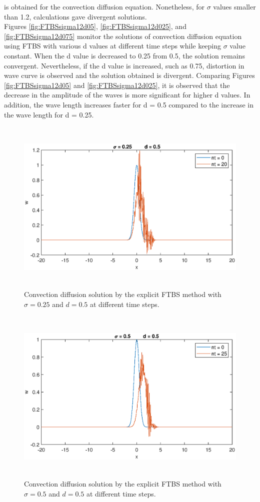 \documentclass[letterpaper,12pt]{article}
\begin{document}
is obtained for the convection diffusion equation. Nonetheless, for $\sigma$ values smaller than 1.2, calculations
gave divergent solutions. 
\\
\indent Figures \ref{fig:FTBSsigma12d05}, \ref{fig:FTBSsigma12d025}, and \ref{fig:FTBSsigma12d075} monitor the 
solutions of convection diffusion equation using FTBS with various d values at different time steps
while keeping $\sigma$ value constant. When the d value is decreased to 0.25 from 0.5, the solution remains
convergent. Nevertheless, if the d value is increased, such as 0.75, distortion in wave curve is observed and
the solution obtained is divergent. Comparing Figures \ref{fig:FTBSsigma12d05} and \ref{fig:FTBSsigma12d025},
it is observed that the decrease in the amplitude of the waves is more significant for higher d values. In addition,
the wave length increases faster for d = 0.5 compared to the increase in the wave length for d = 0.25.
\begin{figure}[!ht] 
	\centering 
	\includegraphics[max height=8.5cm]{graphs/FTBS/ConvectionDiffusion/sigma025d05.eps}
	\caption{Convection diffusion solution by the explicit FTBS method with $\sigma= 0.25$ and $d=0.5$ at different time steps.}
	 \label{fig:FTBSsigma025d05}
\end{figure}
\begin{figure}[!ht] 
	\centering 
	\includegraphics[max height=8.5cm]{graphs/FTBS/ConvectionDiffusion/sigma05d05.eps}
	\caption{Convection diffusion solution by the explicit FTBS method with $\sigma= 0.5$ and $d=0.5$ at different time steps.}
	 \label{fig:FTBSsigma05d05}
\end{figure}
\end{document}
